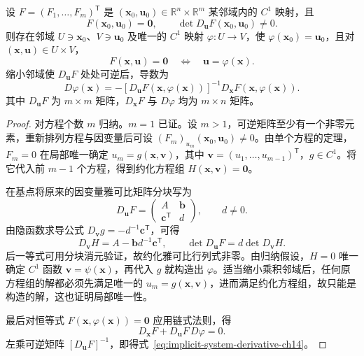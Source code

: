 \begin{theorem}[隐函数组存在定理]
\label{thm:implicit-function-system-ch14}
设 $F=(F_1,\ldots,F_m)^{\mathsf T}$ 是 $(\boldsymbol x_0,\boldsymbol u_0)\in\mathbb R^n\times\mathbb R^m$ 某邻域内的 $C^1$ 映射，且
\[
    F(\boldsymbol x_0,\boldsymbol u_0)=\boldsymbol0,\qquad
    \det D_{\boldsymbol u}F(\boldsymbol x_0,\boldsymbol u_0)\ne0.
\]
则存在邻域 $U\ni\boldsymbol x_0$、$V\ni\boldsymbol u_0$ 及唯一的 $C^1$ 映射 $\varphi:U\to V$，使 $\varphi(\boldsymbol x_0)=\boldsymbol u_0$，且对 $(\boldsymbol x,\boldsymbol u)\in U\times V$，
\[
    F(\boldsymbol x,\boldsymbol u)=\boldsymbol0
       \quad\Longleftrightarrow\quad\boldsymbol u=\varphi(\boldsymbol x).
\]
缩小邻域使 $D_{\boldsymbol u}F$ 处处可逆后，导数为
\begin{equation}
\label{eq:implicit-system-derivative-ch14}
    D\varphi(\boldsymbol x)
    =-[D_{\boldsymbol u}F(\boldsymbol x,\varphi(\boldsymbol x))]^{-1}
       D_{\boldsymbol x}F(\boldsymbol x,\varphi(\boldsymbol x)).
\end{equation}
其中 $D_{\boldsymbol u}F$ 为 $m\times m$ 矩阵，$D_{\boldsymbol x}F$ 与 $D\varphi$ 均为 $m\times n$ 矩阵。
\end{theorem}
\begin{proof}
对方程个数 $m$ 归纳。$m=1$ 已证。设 $m>1$，可逆矩阵至少有一个非零元素，重新排列方程与因变量后可设 $(F_m)_{u_m}(\boldsymbol x_0,\boldsymbol u_0)\ne0$。由单个方程的定理，$F_m=0$ 在局部唯一确定
$u_m=g(\boldsymbol x,\boldsymbol v)$，其中 $\boldsymbol v=(u_1,\ldots,u_{m-1})^{\mathsf T}$，$g\in C^1$。将它代入前 $m-1$ 个方程，得到约化方程组 $H(\boldsymbol x,\boldsymbol v)=\boldsymbol0$。

在基点将原来的因变量雅可比矩阵分块写为
\[
    D_{\boldsymbol u}F=
    \begin{pmatrix}A&\boldsymbol b\\\boldsymbol c^{\mathsf T}&d\end{pmatrix},
    \qquad d\ne0.
\]
由隐函数求导公式 $D_{\boldsymbol v}g=-d^{-1}\boldsymbol c^{\mathsf T}$，可得
\[
    D_{\boldsymbol v}H=A-\boldsymbol b d^{-1}\boldsymbol c^{\mathsf T},\qquad
    \det D_{\boldsymbol u}F=d\det D_{\boldsymbol v}H.
\]
后一等式可用分块消元验证，故约化雅可比行列式非零。由归纳假设，$H=0$ 唯一确定 $C^1$ 函数 $\boldsymbol v=\psi(\boldsymbol x)$，再代入 $g$ 就构造出 $\varphi$。适当缩小乘积邻域后，任何原方程组的解都必须先满足唯一的 $u_m=g(\boldsymbol x,\boldsymbol v)$，进而满足约化方程组，故只能是构造的解，这也证明局部唯一性。

最后对恒等式 $F(\boldsymbol x,\varphi(\boldsymbol x))=\boldsymbol0$ 应用链式法则，得
\[
    D_{\boldsymbol x}F+D_{\boldsymbol u}F\,D\varphi=0.
\]
左乘可逆矩阵 $[D_{\boldsymbol u}F]^{-1}$，即得式~\eqref{eq:implicit-system-derivative-ch14}。
\end{proof}

